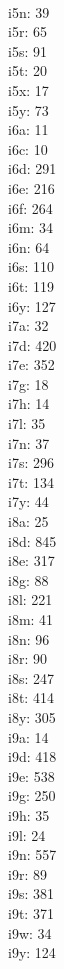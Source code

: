\begin{multicols}{8}
  \\ i5n: 39
  \\ i5r: 65
  \\ i5s: 91
  \\ i5t: 20
  \\ i5x: 17
  \\ i5y: 73
  \\ i6a: 11
  \\ i6c: 10
  \\ i6d: 291
  \\ i6e: 216
  \\ i6f: 264
  \\ i6m: 34
  \\ i6n: 64
  \\ i6s: 110
  \\ i6t: 119
  \\ i6y: 127
  \\ i7a: 32
  \\ i7d: 420
  \\ i7e: 352
  \\ i7g: 18
  \\ i7h: 14
  \\ i7l: 35
  \\ i7n: 37
  \\ i7s: 296
  \\ i7t: 134
  \\ i7y: 44
  \\ i8a: 25
  \\ i8d: 845
  \\ i8e: 317
  \\ i8g: 88
  \\ i8l: 221
  \\ i8m: 41
  \\ i8n: 96
  \\ i8r: 90
  \\ i8s: 247
  \\ i8t: 414
  \\ i8y: 305
  \\ i9a: 14
  \\ i9d: 418
  \\ i9e: 538
  \\ i9g: 250
  \\ i9h: 35
  \\ i9l: 24
  \\ i9n: 557
  \\ i9r: 89
  \\ i9s: 381
  \\ i9t: 371
  \\ i9w: 34
  \\ i9y: 124

\end{multicols}
